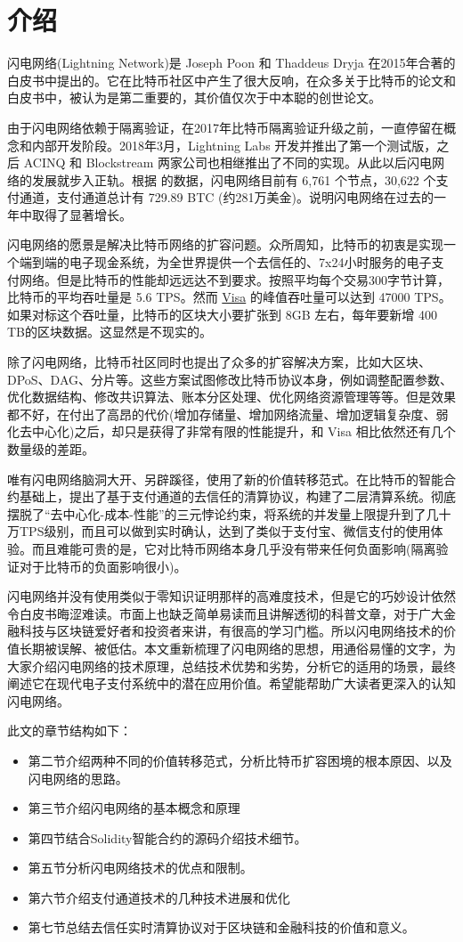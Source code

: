 \section{介绍}

闪电网络(Lightning Network)是 Joseph Poon 和 Thaddeus Dryja 在2015年合著的白皮书中提出的。它在比特币社区中产生了很大反响，在众多关于比特币的论文和白皮书中，被认为是第二重要的，其价值仅次于中本聪的创世论文。

由于闪电网络依赖于隔离验证，在2017年比特币隔离验证升级之前，一直停留在概念和内部开发阶段。2018年3月，Lightning Labs 开发并推出了第一个测试版，之后 ACINQ 和 Blockstream 两家公司也相继推出了不同的实现。从此以后闪电网络的发展就步入正轨。根据 \href{https://1ml.com/statistics}{} 的数据，闪电网络目前有 6,761 个节点，30,622 个支付通道，支付通道总计有 729.89 BTC (约281万美金)。说明闪电网络在过去的一年中取得了显著增长。

闪电网络的愿景是解决比特币网络的扩容问题。众所周知，比特币的初衷是实现一个端到端的电子现金系统，为全世界提供一个去信任的、7x24小时服务的电子支付网络。但是比特币的性能却远远达不到要求。按照平均每个交易300字节计算，比特币的平均吞吐量是 5.6 TPS。然而 \href{https://www.visa.com/blogarchives/us/2013/10/10/stress-test-prepares-visanet-for-the-most-wonderful-time-of-the-year/index.html}{Visa} 的峰值吞吐量可以达到 47000 TPS。如果对标这个吞吐量，比特币的区块大小要扩张到 8GB 左右，每年要新增 400 TB的区块数据。这显然是不现实的。

除了闪电网络，比特币社区同时也提出了众多的扩容解决方案，比如大区块、DPoS、DAG、分片等。这些方案试图修改比特币协议本身，例如调整配置参数、优化数据结构、修改共识算法、账本分区处理、优化网络资源管理等等。但是效果都不好，在付出了高昂的代价(增加存储量、增加网络流量、增加逻辑复杂度、弱化去中心化)之后，却只是获得了非常有限的性能提升，和 Visa 相比依然还有几个数量级的差距。

唯有闪电网络脑洞大开、另辟蹊径，使用了新的价值转移范式。在比特币的智能合约基础上，提出了基于支付通道的去信任的清算协议，构建了二层清算系统。彻底摆脱了“去中心化-成本-性能”的三元悖论约束，将系统的并发量上限提升到了几十万TPS级别，而且可以做到实时确认，达到了类似于支付宝、微信支付的使用体验。而且难能可贵的是，它对比特币网络本身几乎没有带来任何负面影响(隔离验证对于比特币的负面影响很小)。

闪电网络并没有使用类似于零知识证明那样的高难度技术，但是它的巧妙设计依然令白皮书晦涩难读。市面上也缺乏简单易读而且讲解透彻的科普文章，对于广大金融科技与区块链爱好者和投资者来讲，有很高的学习门槛。所以闪电网络技术的价值长期被误解、被低估。本文重新梳理了闪电网络的思想，用通俗易懂的文字，为大家介绍闪电网络的技术原理，总结技术优势和劣势，分析它的适用的场景，最终阐述它在现代电子支付系统中的潜在应用价值。希望能帮助广大读者更深入的认知闪电网络。

此文的章节结构如下：

\begin{itemize}
    \item 第二节介绍两种不同的价值转移范式，分析比特币扩容困境的根本原因、以及闪电网络的思路。
    \item 第三节介绍闪电网络的基本概念和原理
    \item 第四节结合Solidity智能合约的源码介绍技术细节。
    \item 第五节分析闪电网络技术的优点和限制。
    \item 第六节介绍支付通道技术的几种技术进展和优化
    \item 第七节总结去信任实时清算协议对于区块链和金融科技的价值和意义。
\end{itemize}

